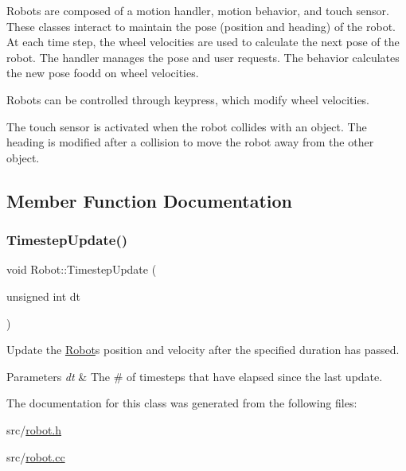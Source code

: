 Robots are composed of a motion handler, motion behavior, and touch sensor. These classes interact to maintain the pose (position and heading) of the robot. At each time step, the wheel velocities are used to calculate the next pose of the robot. The handler manages the pose and user requests. The behavior calculates the new pose foodd on wheel velocities.

Robots can be controlled through keypress, which modify wheel velocities.

The touch sensor is activated when the robot collides with an object. The heading is modified after a collision to move the robot away from the other object. 

\subsection{Member Function Documentation}
\mbox{\label{class_robot_ae790462f8782efcfd26082eedec30ed5}} 
\subsubsection{\texorpdfstring{Timestep\+Update()}{TimestepUpdate()}}
{\footnotesize\ttfamily void Robot\+::\+Timestep\+Update (\begin{DoxyParamCaption}\item[{unsigned int}]{dt }\end{DoxyParamCaption})\hspace{0.3cm}{\ttfamily [override]}}



Update the \mbox{\hyperlink{class_robot}{Robot}}\textquotesingle{}s position and velocity after the specified duration has passed. 


\begin{DoxyParams}{Parameters}
{\em dt} & The \# of timesteps that have elapsed since the last update. \\
\hline
\end{DoxyParams}


The documentation for this class was generated from the following files\+:\begin{DoxyCompactItemize}
\item 
src/\mbox{\hyperlink{robot_8h}{robot.\+h}}\item 
src/\mbox{\hyperlink{robot_8cc}{robot.\+cc}}\end{DoxyCompactItemize}
